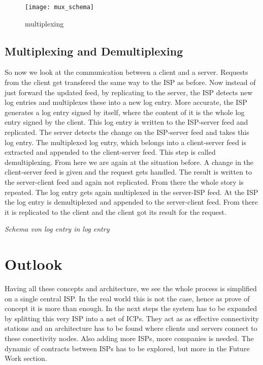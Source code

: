 \begin{figure}
    \centering
    \texttt{[image: mux\_schema]}
    \caption{multiplexing}
    \label{fig:mux}
\end{figure}

\subsection{Multiplexing and Demultiplexing}
So now we look at the communication between a client and a server. Requests from the client get transfered the same way to the ISP as before. Now instead of just forward the updated feed, by replicating to the server, the ISP detects new log entries and multiplexes these into a new log entry.
More accurate, the ISP generates a log entry signed by itself, where the content of it is the whole log entry signed by the client. This log entry is written to the ISP-server feed and replicated. The server detects the change on the ISP-server feed and takes this log entry. The multiplexed log entry, which belongs into a client-server feed is extracted and appended to the client-server feed. This step is called demultiplexing. From here we are again at the situation before. A change in the client-server feed is given and the request gets handled. The result is written to the server-client feed and again not replicated. From there the whole story is repeated. The log entry gets again multiplexed in the server-ISP feed. At the ISP the log entry is demultiplexed and appended to the server-client feed. From there it is replicated to the client and the client got its result for the request.

\textit{Schema von log entry in log entry}


\section{Outlook}
Having all these concepts and architecture, we see the whole process is simplified on a single central ISP. In the real world this is not the case, hence as prove of concept it is more than enough. In the next steps the system has to be expanded by splitting this very ISP into a net of ICPs. They act as as effective connectivity stations and an architecture has to be found where clients and servers connect to these conectivity nodes. Also adding more ISPs, more companies is needed. The dynamic of contracts between ISPs has to be explored, but more in the Future Work section.